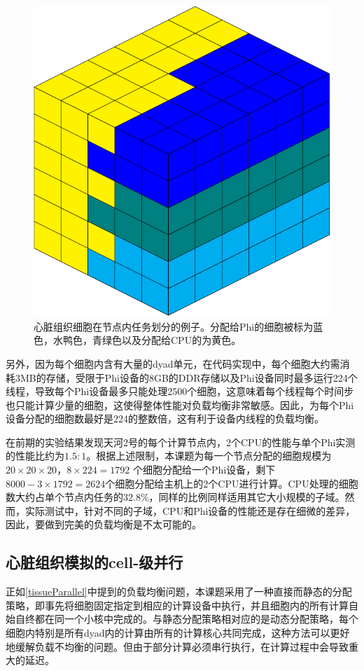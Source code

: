  \begin{figure}[bth]
\center
\includegraphics[scale=0.5]{figs/cube}
\caption{心脏组织细胞在节点内任务划分的例子。分配给Phi的细胞被标为蓝色，水鸭色，青绿色以及分配给CPU的为黄色。}
\label{nodeload}
\end{figure}

另外，因为每个细胞内含有大量的dyad单元，在代码实现中，每个细胞大约需消耗3MB的存储，受限于Phi设备的8GB的DDR存储以及Phi设备同时最多运行224个线程，导致每个Phi设备最多只能处理2500个细胞，这意味着每个线程每个时间步也只能计算少量的细胞，这使得整体性能对负载均衡非常敏感。因此，为每个Phi设备分配的细胞数最好是224的整数倍，这有利于设备内线程的负载均衡。

在前期的实验结果发现天河2号的每个计算节点内，2个CPU的性能与单个Phi实测的性能比约为$1.5 : 1$。根据上述限制，本课题为每一个节点分配的细胞规模为$20\times20\times20$，$8\times224=1792$ 个细胞分配给一个Phi设备，剩下$8000-3\times1792=2624$个细胞分配给主机上的2个CPU进行计算。CPU处理的细胞数大约占单个节点内任务的$32.8\%$，同样的比例同样适用其它大小规模的子域。然而，实际测试中，针对不同的子域，CPU和Phi设备的性能还是存在细微的差异，因此，要做到完美的负载均衡是不太可能的。

 
\subsection{心脏组织模拟的cell-级并行}
正如\ref{tissueParallel}中提到的负载均衡问题，本课题采用了一种直接而静态的分配策略，即事先将细胞固定指定到相应的计算设备中执行，并且细胞内的所有计算自始自终都在同一个小核中完成的。与静态分配策略相对应的是动态分配策略，每个细胞内特别是所有dyad内的计算由所有的计算核心共同完成，这种方法可以更好地缓解负载不均衡的问题。但由于部分计算必须串行执行，在计算过程中会导致重大的延迟。

